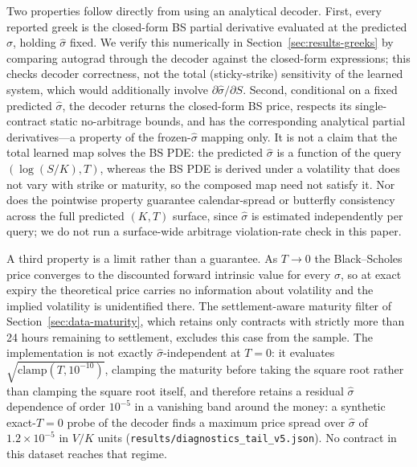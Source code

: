 \documentclass[11pt]{article}
\begin{document}
Two properties follow directly from using an analytical decoder. First, every reported greek is the
closed-form BS partial derivative evaluated at the predicted $\hat\sigma$, holding $\hat\sigma$ fixed.
We verify this numerically in Section~\ref{sec:results-greeks} by comparing autograd through the
decoder against the closed-form expressions; this checks decoder correctness, not the total
(sticky-strike) sensitivity of the learned system, which would additionally involve $\partial \hat\sigma
/ \partial S$. Second, conditional on a fixed predicted $\hat\sigma$, the decoder returns the
closed-form BS price, respects its single-contract static no-arbitrage bounds, and has the
corresponding analytical partial derivatives---a property of the frozen-$\hat\sigma$ mapping only.
It is not a claim that the total learned map solves the BS PDE: the predicted $\hat\sigma$ is a
function of the query $(\log(S/K), T)$, whereas the BS PDE is derived under a volatility that does not
vary with strike or maturity, so the composed map need not satisfy it. Nor does the pointwise property
guarantee calendar-spread or butterfly consistency across the full predicted $(K,T)$ surface, since
$\hat\sigma$ is estimated independently per query; we do not run a surface-wide arbitrage
violation-rate check in this paper.

A third property is a limit rather than a guarantee. As $T \to 0$ the Black--Scholes price converges to
the discounted forward intrinsic value for every $\sigma$, so at exact expiry the theoretical price
carries no information about volatility and the implied volatility is unidentified there. The
settlement-aware maturity filter of Section~\ref{sec:data-maturity}, which retains only contracts with
strictly more than 24 hours remaining to settlement, excludes this case from the sample. The
implementation is not exactly $\hat\sigma$-independent at $T{=}0$: it evaluates
$\sqrt{\mathrm{clamp}(T, 10^{-10})}$, clamping the maturity before taking the square root rather than
clamping the square root itself, and therefore retains a residual $\hat\sigma$ dependence of order
$10^{-5}$ in a vanishing band around the money: a synthetic exact-$T{=}0$ probe of the decoder finds a
maximum price spread over $\hat\sigma$ of $1.2\times10^{-5}$ in $V/K$ units
(\texttt{results/diagnostics\_tail\_v5.json}). No contract in this dataset reaches that regime.
\end{document}
